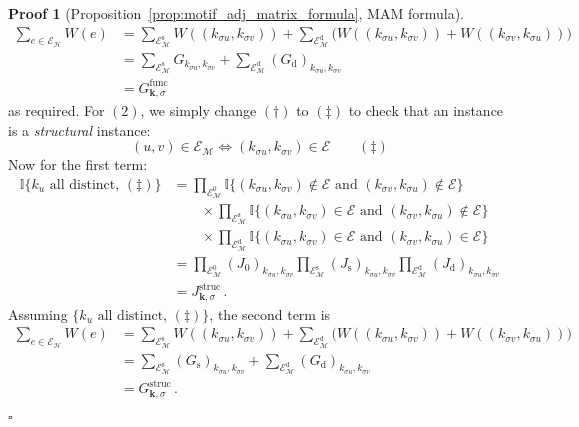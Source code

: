 \documentclass[12pt]{ociamthesis}
\theoremstyle{plain}
\theoremstyle{definition}
\newtheorem{prf}{Proof}[chapter]
\theoremstyle{remark}
\newcommand\bb[1]{\mathbb{#1}}
\newcommand\ca[1]{\mathcal{#1}}
\begin{document}
\begin{prf}[Proposition~\ref{prop:motif_adj_matrix_formula}, MAM formula]
%
\begin{align*}
%
\sum_{e \in \ca{E_H}} W(e)
&= \sum_{\ca{E}_\ca{M}^\mathrm{s}} W((k_{\sigma u},k_{\sigma v}))
+ \sum_{\ca{E}_\ca{M}^\mathrm{d}} \big( W((k_{\sigma u},k_{\sigma v})) +
W((k_{\sigma v},k_{\sigma u})) \big) \\
%
&= \sum_{\ca{E}_\ca{M}^\mathrm{s}} G_{k_{\sigma u},k_{\sigma v}}
+ \sum_{\ca{E}_\ca{M}^\mathrm{d}} (G_\mathrm{d})_{k_{\sigma u},k_{\sigma
v}} \\
%
&= G^\mathrm{func}_{\mathbf{k},\sigma}
\end{align*}
%
as required. For $(2)$, we simply change $(\dagger)$ to $(\ddagger)$ to check
that an instance is a \emph{structural} instance:
%
$$ (u,v) \in \ca{E_M} \iff (k_{\sigma u}, k_{\sigma v}) \in \ca{E} \qquad
(\ddagger) $$
%
Now for the first term:
%
\begin{align*}
%
\bb{I} \big\{ k_u \textrm{ all distinct}, \, (\ddagger) \big\}
&= \prod_{\ca{E}_\ca{M}^0} \bb{I} \{(k_{\sigma u}, k_{\sigma v}) \notin
\ca{E} \textrm{ and } (k_{\sigma v}, k_{\sigma u}) \notin \ca{E}\} \\
& \qquad \times \prod_{\ca{E}_\ca{M}^\mathrm{s}} \bb{I} \{(k_{\sigma u},
k_{\sigma v}) \in \ca{E} \textrm{ and } (k_{\sigma v}, k_{\sigma u})
\notin
\ca{E}\} \\
& \qquad \times \prod_{\ca{E}_\ca{M}^\mathrm{d}} \bb{I} \{(k_{\sigma u},
k_{\sigma v}) \in \ca{E} \textrm{ and } (k_{\sigma v}, k_{\sigma u}) \in
\ca{E}\} \\
%
&= \prod_{\ca{E}_\ca{M}^0} (J_\mathrm{0})_{k_{\sigma u},k_{\sigma v}}
\prod_{\ca{E}_\ca{M}^\mathrm{s}} (J_\mathrm{s})_{k_{\sigma u},k_{\sigma v}}
\prod_{\ca{E}_\ca{M}^\mathrm{d}} (J_\mathrm{d})_{k_{\sigma u},k_{\sigma v}}
\\
%
&= J^\mathrm{struc}_{\mathbf{k},\sigma}\,.
%
\end{align*}
%
Assuming $\big\{ k_u \textrm{ all distinct}, \, (\ddagger) \big\}$, the
second term is
%
\begin{align*}
%
\sum_{e \in \ca{E_H}} W(e)
&= \sum_{\ca{E}_\ca{M}^\mathrm{s}} W((k_{\sigma u},k_{\sigma v}))
+ \sum_{\ca{E}_\ca{M}^\mathrm{d}} \big( W((k_{\sigma u},k_{\sigma v})) +
W((k_{\sigma v},k_{\sigma u})) \big) \\
%
&= \sum_{\ca{E}_\ca{M}^\mathrm{s}} (G_\mathrm{s})_{k_{\sigma u},k_{\sigma
v}}
+ \sum_{\ca{E}_\ca{M}^\mathrm{d}} (G_\mathrm{d})_{k_{\sigma u},k_{\sigma
v}} \\
%
&= G^\mathrm{struc}_{\mathbf{k},\sigma}\,.
\end{align*}

\hfill $\square$
\end{prf}
\end{document}
